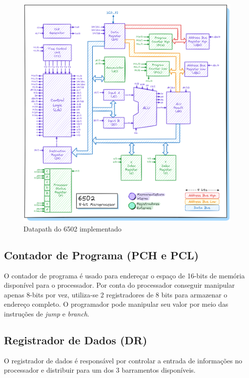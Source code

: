 \documentclass[
	12pt,				  %
	openright,		%
	a4paper,			%
	english,			%
	french,				%
	spanish,			%
	brazil,				%
]{abntex2}
\begin{document}
\begin{figure}[h]
	\centering
	\caption{Datapath do 6502 implementado} \label{fig:6502}
	\includegraphics[scale=0.22]{../assets/img/6502.png}
\end{figure}


\begin{figure}[h]


\end{figure}

\subsection{Contador de Programa (PCH e PCL)}

O contador de programa é usado para endereçar o espaço de 16-bits de memória
disponível para o processador. Por conta do processador conseguir manipular
apenas 8-bits por vez, utiliza-se 2 registradores de 8 bits para armazenar o
endereço completo. O programador pode manipular seu valor por meio das
instruções de \emph{jump} e \emph{branch}.

\subsection{Registrador de Dados (DR)}
O registrador de dados é responsável por controlar a entrada de informações
no processador e distribuir para um dos 3 barramentos disponíveis.
\end{document}
